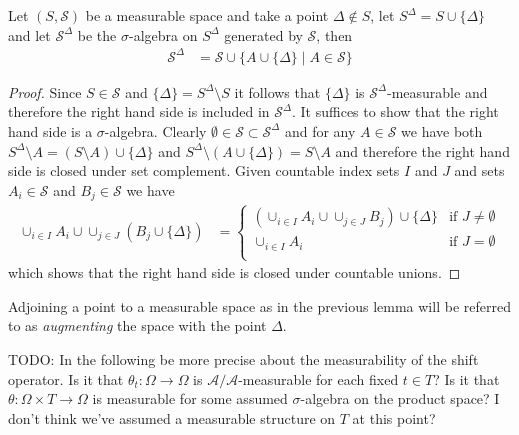 \begin{lem}\label{AugmentingMeasurableSpace}Let $(S, \mathcal{S})$ be a measurable space and take a point $\Delta \notin S$, let $S^{\Delta} = S \cup \lbrace \Delta \rbrace$ and let $\mathcal{S}^\Delta$ be the $\sigma$-algebra on $S^\Delta$ generated by $\mathcal{S}$, then 
\begin{align*}
\mathcal{S}^\Delta &= \mathcal{S} \cup \lbrace A \cup \lbrace \Delta \rbrace \mid A \in \mathcal{S}\rbrace
\end{align*}
\end{lem}
\begin{proof}
Since $S \in \mathcal{S}$ and $\lbrace \Delta \rbrace = S^\Delta \setminus S$ it follows that $\lbrace \Delta \rbrace$ is $\mathcal{S}^\Delta$-measurable and therefore the right hand side is included in $\mathcal{S}^\Delta$.  It suffices to show that the right hand side is a $\sigma$-algebra.  Clearly $\emptyset \in \mathcal{S} \subset \mathcal{S}^\Delta$ and for any $A \in \mathcal{S}$ we have both $S^\Delta \setminus A = (S\setminus A) \cup \lbrace \Delta \rbrace$ and $S^\Delta \setminus (A \cup \lbrace \Delta \rbrace) = S \setminus A$ and therefore the right hand side is closed under set complement.  Given countable index sets $I$ and $J$ and sets $A_i \in \mathcal{S}$ and $B_j \in \mathcal{S}$ we have
\begin{align*}
\cup_{i \in I} A_i \cup \cup_{j \in J} (B_j \cup \lbrace \Delta \rbrace) &=
\begin{cases}
(\cup_{i \in I} A_i \cup \cup_{j \in J} B_j) \cup \lbrace \Delta \rbrace & \text{if $J \neq \emptyset$} \\
\cup_{i \in I} A_i & \text{if $J = \emptyset$} \\
\end{cases}
\end{align*}
which shows that the right hand side is closed under countable unions. 
\end{proof}
Adjoining a point to a measurable space as in the previous lemma will be referred to as \emph{augmenting} the space with the point $\Delta$.

TODO: In the following be more precise about the measurability of the shift operator.  Is it that $\theta_t : \Omega \to \Omega$ is $\mathcal{A}/\mathcal{A}$-measurable for each fixed $t \in T$?   Is it that $\theta : \Omega \times T \to \Omega$ is measurable for some assumed $\sigma$-algebra on the product space?    I don't think we've assumed a measurable structure on $T$ at this point?   

